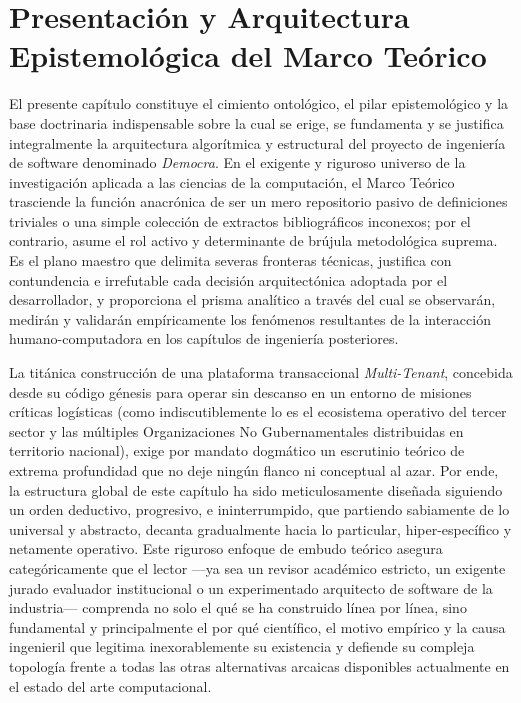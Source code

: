 \section{Presentación y Arquitectura Epistemológica del Marco Teórico}

El presente capítulo constituye el cimiento ontológico, el pilar epistemológico y la base doctrinaria indispensable sobre la cual se erige, se fundamenta y se justifica integralmente la arquitectura algorítmica y estructural del proyecto de ingeniería de software denominado \textit{Democra}. En el exigente y riguroso universo de la investigación aplicada a las ciencias de la computación, el Marco Teórico trasciende la función anacrónica de ser un mero repositorio pasivo de definiciones triviales o una simple colección de extractos bibliográficos inconexos; por el contrario, asume el rol activo y determinante de brújula metodológica suprema. Es el plano maestro que delimita severas fronteras técnicas, justifica con contundencia e irrefutable cada decisión arquitectónica adoptada por el desarrollador, y proporciona el prisma analítico a través del cual se observarán, medirán y validarán empíricamente los fenómenos resultantes de la interacción humano-computadora en los capítulos de ingeniería posteriores.

La titánica construcción de una plataforma transaccional \textit{Multi-Tenant}, concebida desde su código génesis para operar sin descanso en un entorno de misiones críticas logísticas (como indiscutiblemente lo es el ecosistema operativo del tercer sector y las múltiples Organizaciones No Gubernamentales distribuidas en territorio nacional), exige por mandato dogmático un escrutinio teórico de extrema profundidad que no deje ningún flanco ni conceptual al azar. Por ende, la estructura global de este capítulo ha sido meticulosamente diseñada siguiendo un orden deductivo, progresivo, e ininterrumpido, que partiendo sabiamente de lo universal y abstracto, decanta gradualmente hacia lo particular, hiper-específico y netamente operativo. Este riguroso enfoque de embudo teórico asegura categóricamente que el lector ---ya sea un revisor académico estricto, un exigente jurado evaluador institucional o un experimentado arquitecto de software de la industria--- comprenda no solo el qué se ha construido línea por línea, sino fundamental y principalmente el por qué científico, el motivo empírico y la causa ingenieril que legitima inexorablemente su existencia y defiende su compleja topología frente a todas las otras alternativas arcaicas disponibles actualmente en el estado del arte computacional.

